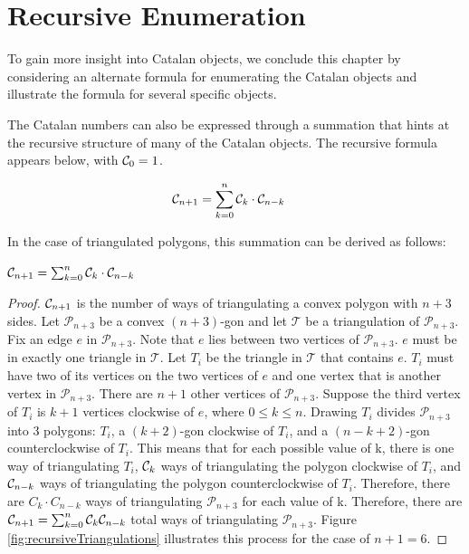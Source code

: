 \section{Recursive Enumeration}

To gain more insight into Catalan objects, we conclude this chapter by considering an alternate formula for enumerating the Catalan objects and illustrate the formula for several specific objects.

The Catalan numbers can also be expressed through a summation that hints at the recursive structure of many of the Catalan objects.  
The recursive formula appears below, with $\mathcal{C}_0=1$.

\begin{align}
    \mathcal{C}_{n+1} &= \sum_{k=0}^{n}{\mathcal{C}_{k}\cdot\mathcal{C}_{n-k}}
\end{align} 

In the case of triangulated polygons, this summation can be derived as follows:

\begin{theorem}
    $\mathcal{C}_{n+1} = \sum_{k=0}^{n}{\mathcal{C}_{k}\cdot\mathcal{C}_{n-k}}$
\end{theorem}
\begin{proof}
$\mathcal{C}_{n+1}$ is the number of ways of triangulating a convex polygon with $n+3$ sides.  Let $\mathcal{P}_{n+3}$ be a convex $(n+3)$-gon and let $\mathcal{T}$ be a triangulation of $\mathcal{P}_{n+3}$. Fix an edge $e$ in $\mathcal{P}_{n+3}$.  Note that $e$ lies between two vertices of $\mathcal{P}_{n+3}$. $e$ must be in exactly one triangle in $\mathcal{T}$.  Let $T_{i}$ be the triangle in $\mathcal{T}$ that contains $e$.  $T_{i}$ must have two of its vertices on the two vertices of $e$ and one vertex that is another vertex in $\mathcal{P}_{n+3}$.  There are $n+1$ other vertices of $\mathcal{P}_{n+3}$.  Suppose the third vertex of $T_i$ is $k+1$ vertices clockwise of $e$, where $0\le k \le n$. Drawing $T_i$ divides $\mathcal{P}_{n+3}$ into 3 polygons: $T_i$, a $(k+2)$-gon clockwise of $T_i$, and a $(n-k+2)$-gon counterclockwise of $T_i$. This means that for each possible value of k, there is one way of triangulating $T_i$, $\mathcal{C}_k$ ways of triangulating the polygon clockwise of $T_i$, and $\mathcal{C}_{n-k}$ ways of triangulating the polygon counterclockwise of $T_i$.  Therefore, there are $C_k\cdot C_{n-k}$ ways of triangulating $\mathcal{P}_{n+3}$ for each value of k.  Therefore, there are $\mathcal{C}_{n+1}=\sum_{k=0}^{n}{\mathcal{C}_{k}\mathcal{C}_{n-k}}$ total ways of triangulating $\mathcal{P}_{n+3}$. Figure \ref{fig:recursiveTriangulations} illustrates this process for the case of $n+1=6$.
\end{proof}



